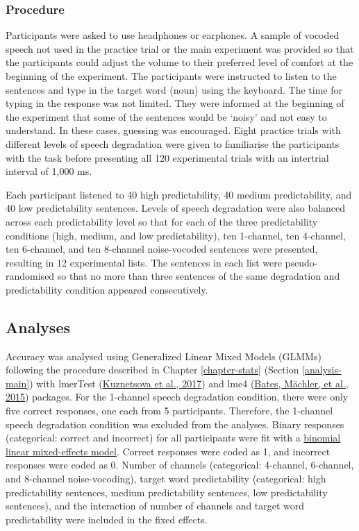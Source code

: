 \documentclass[a4paper, nobind]{templates/ociamthesis}
\begin{document}
\hypertarget{procedure}{%
\subsubsection{Procedure}\label{procedure}}

Participants were asked to use headphones or earphones.
A sample of vocoded speech not used in the practice trial or the main experiment was provided so that the participants could adjust the volume to their preferred level of comfort at the beginning of the experiment.
The participants were instructed to listen to the sentences and type in the target word (noun) using the keyboard.
The time for typing in the response was not limited.
They were informed at the beginning of the experiment that some of the sentences would be `noisy' and not easy to understand.
In these cases, guessing was encouraged.
Eight practice trials with different levels of speech degradation were given to familiarise the participants with the task before presenting all 120 experimental trials with an intertrial interval of 1,000 ms.

Each participant listened to 40 high predictability, 40 medium predictability, and 40 low predictability sentences.
Levels of speech degradation were also balanced across each predictability level so that for each of the three predictability conditions (high, medium, and low predictability), ten 1-channel, ten 4-channel, ten 6-channel, and ten 8-channel noise-vocoded sentences were presented, resulting in 12 experimental lists.
The sentences in each list were pseudo-randomised so that no more than three sentences of the same degradation and predictability condition appeared consecutively.

\hypertarget{analyses}{%
\subsection{Analyses}\label{analyses}}

Accuracy was analysed using Generalized Linear Mixed Models (GLMMs) following the procedure described in Chapter \ref{chapter-stats} (Section \ref{analysis-main}) with lmerTest (\protect\hyperlink{ref-Kuznetsova2017}{Kuznetsova et al., 2017}) and lme4 (\protect\hyperlink{ref-Bates2015}{Bates, Mächler, et al., 2015}) packages.
For the 1-channel speech degradation condition, there were only five correct responses, one each from 5 participants.
Therefore, the 1-channel speech degradation condition was excluded from the analyses.
Binary responses (categorical: correct and incorrect) for all participants were fit with a \protect\hyperlink{binomial-logistic-mixed-effects-model}{binomial linear mixed-effects model}.
Correct responses were coded as 1, and incorrect responses were coded as 0.
Number of channels (categorical: 4-channel, 6-channel, and 8-channel noise-vocoding), target word predictability (categorical: high predictability sentences, medium predictability sentences, low predictability sentences), and the interaction of number of channels and target word predictability were included in the fixed effects.
\end{document}

